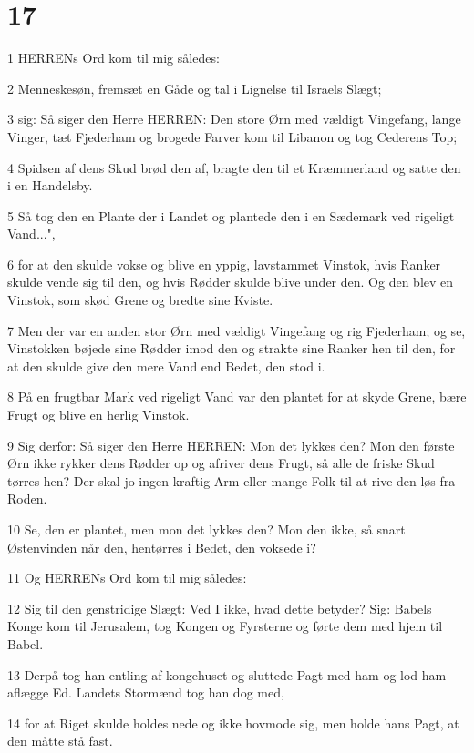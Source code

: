 \chapter{17}

\par 1 HERRENs Ord kom til mig således:
\par 2 Menneskesøn, fremsæt en Gåde og tal i Lignelse til Israels Slægt;
\par 3 sig: Så siger den Herre HERREN: Den store Ørn med vældigt Vingefang, lange Vinger, tæt Fjederham og brogede Farver kom til Libanon og tog Cederens Top;
\par 4 Spidsen af dens Skud brød den af, bragte den til et Kræmmerland og satte den i en Handelsby.
\par 5 Så tog den en Plante der i Landet og plantede den i en Sædemark ved rigeligt Vand...",
\par 6 for at den skulde vokse og blive en yppig, lavstammet Vinstok, hvis Ranker skulde vende sig til den, og hvis Rødder skulde blive under den. Og den blev en Vinstok, som skød Grene og bredte sine Kviste.
\par 7 Men der var en anden stor Ørn med vældigt Vingefang og rig Fjederham; og se, Vinstokken bøjede sine Rødder imod den og strakte sine Ranker hen til den, for at den skulde give den mere Vand end Bedet, den stod i.
\par 8 På en frugtbar Mark ved rigeligt Vand var den plantet for at skyde Grene, bære Frugt og blive en herlig Vinstok.
\par 9 Sig derfor: Så siger den Herre HERREN: Mon det lykkes den? Mon den første Ørn ikke rykker dens Rødder op og afriver dens Frugt, så alle de friske Skud tørres hen? Der skal jo ingen kraftig Arm eller mange Folk til at rive den løs fra Roden.
\par 10 Se, den er plantet, men mon det lykkes den? Mon den ikke, så snart Østenvinden når den, hentørres i Bedet, den voksede i?
\par 11 Og HERRENs Ord kom til mig således:
\par 12 Sig til den genstridige Slægt: Ved I ikke, hvad dette betyder? Sig: Babels Konge kom til Jerusalem, tog Kongen og Fyrsterne og førte dem med hjem til Babel.
\par 13 Derpå tog han entling af kongehuset og sluttede Pagt med ham og lod ham aflægge Ed. Landets Stormænd tog han dog med,
\par 14 for at Riget skulde holdes nede og ikke hovmode sig, men holde hans Pagt, at den måtte stå fast.
